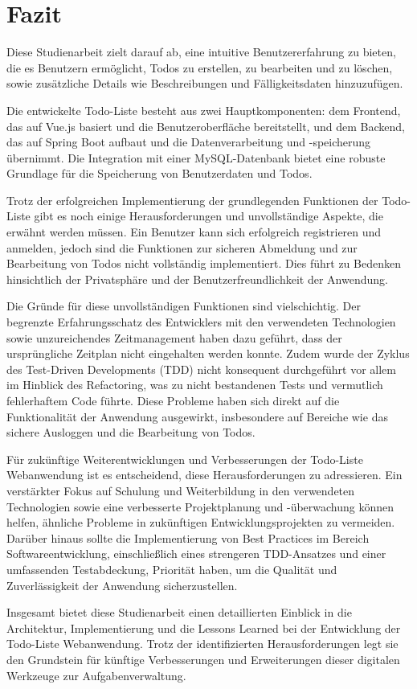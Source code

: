 \chapter{Fazit}
Diese Studienarbeit zielt darauf ab, eine intuitive Benutzererfahrung zu bieten, die es Benutzern ermöglicht, Todos zu erstellen, zu bearbeiten und zu löschen, sowie zusätzliche Details wie Beschreibungen und Fälligkeitsdaten hinzuzufügen.

Die entwickelte Todo-Liste besteht aus zwei Hauptkomponenten: dem Frontend, das auf Vue.js basiert und die Benutzeroberfläche bereitstellt, und dem Backend, das auf Spring Boot aufbaut und die Datenverarbeitung und -speicherung übernimmt. Die Integration mit einer MySQL-Datenbank bietet eine robuste Grundlage für die Speicherung von Benutzerdaten und Todos.

Trotz der erfolgreichen Implementierung der grundlegenden Funktionen der Todo-Liste gibt es noch einige Herausforderungen und unvollständige Aspekte, die erwähnt werden müssen. Ein Benutzer kann sich erfolgreich registrieren und anmelden, jedoch sind die Funktionen zur sicheren Abmeldung und zur Bearbeitung von Todos nicht vollständig implementiert. Dies führt zu Bedenken hinsichtlich der Privatsphäre und der Benutzerfreundlichkeit der Anwendung.

Die Gründe für diese unvollständigen Funktionen sind vielschichtig. Der begrenzte Erfahrungsschatz des Entwicklers mit den verwendeten Technologien sowie unzureichendes Zeitmanagement haben dazu geführt, dass der ursprüngliche Zeitplan nicht eingehalten werden konnte. Zudem wurde der Zyklus des Test-Driven Developments (TDD) nicht konsequent durchgeführt vor allem im Hinblick des Refactoring, was zu nicht bestandenen Tests und vermutlich fehlerhaftem Code führte. Diese Probleme haben sich direkt auf die Funktionalität der Anwendung ausgewirkt, insbesondere auf Bereiche wie das sichere Ausloggen und die Bearbeitung von Todos.

Für zukünftige Weiterentwicklungen und Verbesserungen der Todo-Liste Webanwendung ist es entscheidend, diese Herausforderungen zu adressieren. Ein verstärkter Fokus auf Schulung und Weiterbildung in den verwendeten Technologien sowie eine verbesserte Projektplanung und -überwachung können helfen, ähnliche Probleme in zukünftigen Entwicklungsprojekten zu vermeiden. Darüber hinaus sollte die Implementierung von Best Practices im Bereich Softwareentwicklung, einschließlich eines strengeren TDD-Ansatzes und einer umfassenden Testabdeckung, Priorität haben, um die Qualität und Zuverlässigkeit der Anwendung sicherzustellen.

Insgesamt bietet diese Studienarbeit einen detaillierten Einblick in die Architektur, Implementierung und die Lessons Learned bei der Entwicklung der Todo-Liste Webanwendung. Trotz der identifizierten Herausforderungen legt sie den Grundstein für künftige Verbesserungen und Erweiterungen dieser digitalen Werkzeuge zur Aufgabenverwaltung.